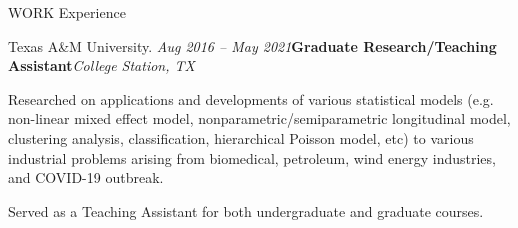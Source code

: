 \documentclass[
	11pt, %
]{resume} %
\begin{document}
\begin{rSection}{WORK Experience}
\begin{rSubsection}{Texas A\&M University.
}{\em Aug 2016 -- May 2021}{\textbf{Graduate Research/Teaching Assistant}}{\em College Station, TX}
\item Researched on applications and developments of various statistical models (e.g. non-linear mixed effect model, nonparametric/semiparametric longitudinal model, clustering analysis, classification, hierarchical Poisson model, etc) to various industrial problems arising from biomedical, petroleum, wind energy industries, and COVID-19 outbreak.
\item Served as a Teaching Assistant for both undergraduate and graduate courses.
\end{rSubsection}


\end{rSection}

\end{document}
